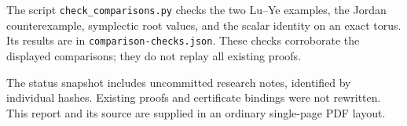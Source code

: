 The script \nolinkurl{check_comparisons.py} checks the two Lu--Ye examples, the Jordan counterexample, symplectic root values, and the scalar identity on an exact torus. Its results are in \nolinkurl{comparison-checks.json}. These checks corroborate the displayed comparisons; they do not replay all existing proofs.

The status snapshot includes uncommitted research notes, identified by individual hashes. Existing proofs and certificate bindings were not rewritten. This report and its source are supplied in an ordinary single-page PDF layout.
